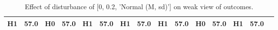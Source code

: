 \begin{table}
\begin{tabular}{l|cc|cc|cc|cc|cc|cc|cc}
\cellcolor{Bittersweet}H1&\cellcolor{Bittersweet}57.0&\cellcolor{Bittersweet}H0&\cellcolor{Bittersweet}57.0&\cellcolor{Bittersweet}H1&\cellcolor{Bittersweet}57.0&\cellcolor{Bittersweet}H1&\cellcolor{Bittersweet}57.0&\cellcolor{Bittersweet}H1&\cellcolor{Bittersweet}57.0&\cellcolor{Bittersweet}H0&\cellcolor{Bittersweet}57.0&\cellcolor{Bittersweet}H1&\cellcolor{Bittersweet}57.0\\\bottomrule\end{tabular}\caption{Effect of disturbance of [0, 0.2, 'Normal (M, sd)'] on weak view of outcomes.}\end{table}